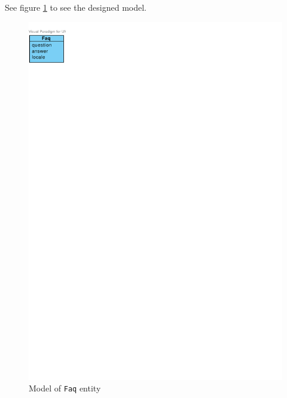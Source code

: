 See figure \ref{fig:domain-faq-entity} to see the designed model.

\begin{figure}[h]
    \centering
        \includegraphics[trim=0 740 510 30, clip, keepaspectratio]{./images/domain-faq-entity.pdf}
    \caption{Model of \texttt{Faq} entity}
    \label{fig:domain-faq-entity}
\end{figure}